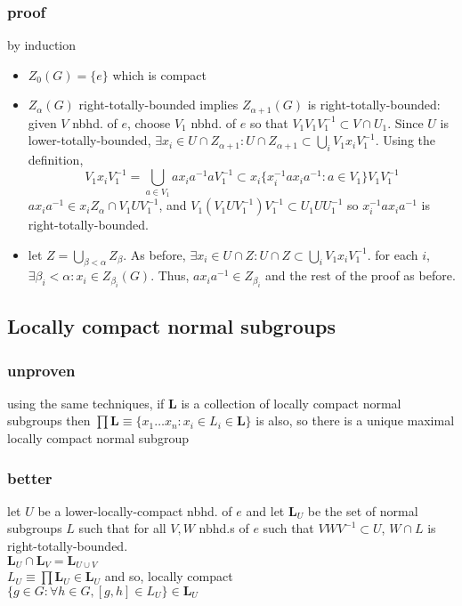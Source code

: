 \documentclass[a4paper]{article}
\newcommand{\LL}{\mathbf{L}}
\newcommand{\inv }{^{-1}}
\begin{document}
\subsubsection*{proof}by induction
\begin{itemize}
\item $Z_0(G) = \{e\}$ which is compact
\item $Z_\alpha(G)$ right-totally-bounded implies $Z_{\alpha+1}(G)$ is right-totally-bounded:
\\ given $V$ nbhd. of $e$, choose $V_1$ nbhd. of $e$ so that $V_1 V_1 V_1\inv \subset V \cap U_1$. Since $U$ is lower-totally-bounded, $\exists x_i \in U \cap Z_{\alpha+1} :U \cap Z_{\alpha+1} \subset \bigcup_i V_1 x_i V_1\inv $. Using the definition, \[V_1 x_i V_1\inv = \bigcup_{a \in V_1} a x_i a\inv a V_1\inv \subset x_i \{x_i\inv a x_i a\inv: a \in V_1 \} V_1 V_1\inv \] $a x_i a\inv \in x_i Z_\alpha \cap V_1 U V_1\inv $, and $V_1 (V_1 U V_1\inv) V_1\inv \subset U_1 U U_1\inv $ so $x_i\inv a x_i a\inv $ is right-totally-bounded. 
\item let $Z=\bigcup_{\beta < \alpha} Z_\beta$. As before, $\exists x_i \in U \cap Z : U \cap Z \subset \bigcup_i V_1 x_i V_1\inv $. for each $i$, $\exists \beta_i < \alpha : x_i \in Z_{\beta_i}(G)$. Thus, $a x_i a\inv \in Z_{\beta_i} $ and the rest of the proof as before.
\end{itemize}
\subsection{Locally  compact normal subgroups}
\subsubsection{unproven}
using the  same techniques, if $\mathbf L $ is a collection of locally compact normal subgroups then $\prod \LL \equiv \{ x_1  \dots  x_n : x_i \in L_i \in \LL\}$ is also,
so there is a unique maximal locally compact normal subgroup
\subsubsection{better}
let $U$ be a lower-locally-compact nbhd. of $e$ and let $\LL_U $ be the set of normal subgroups $L$ such that for all $V, W$ nbhd.s of $e$ such that $V W V\inv \subset U $, $W \cap L$ is right-totally-bounded.
\\ $ \LL_U \cap \LL_V = \LL_{U \cup V}$
\\ $L_U \equiv \prod \LL_U \in \LL_U$ and so, locally compact
\\ $\{g \in G : \forall h \in G, [g, h] \in L_U \} \in \LL_U $



\end{document}
